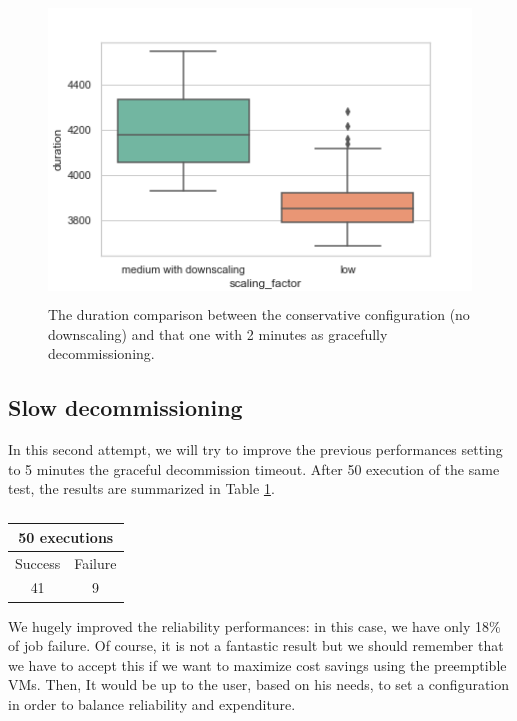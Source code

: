 \documentclass[12pt,twoside,cucitura]{toptesi}
\begin{document}
\begin{figure}
\centering
\includegraphics[height=80mm]{fast-down-duration}
\caption{The duration comparison between the conservative configuration (no downscaling) and that one with 2 minutes as gracefully decommissioning.}\label{fig:fast-down-duration}
\end{figure}

\subsection{Slow decommissioning}
In this second attempt, we will try to improve the previous performances setting to 5 minutes the graceful decommission timeout. After 50 execution of the same test, the results are summarized in Table \ref{table:slow-down}.

\begin{table}[]
\centering
\begin{tabular}{|c|c|}
\hline
\multicolumn{2}{|c|}{50 executions} \\ \hline
Success          & Failure          \\ \hline
41               & 9               \\ \hline
\end{tabular}
\caption{}\label{table:slow-down}
\end{table}

We hugely improved the reliability performances: in this case, we have only 18\% of job failure. Of course, it is not a fantastic result but we should remember that we have to accept this if we want to maximize cost savings using the preemptible VMs. Then, It would be up to the user, based on his needs, to set a configuration in order to balance reliability and expenditure.
\end{document}
